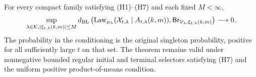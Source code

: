 \begin{theorem}
\label{thm:v36-microscopic-path-bridge}
For every compact family satisfying \textup{(H1)--(H7)} and each fixed
$M<\infty$,
\begin{align}
 \sup_{\substack{\lambda\in\mathcal K,
                     |\xi_{t,\lambda}(k,m)|\le M}}
 d_{\rm BL}\left(
  \operatorname{Law}_{\mu_\lambda}(\mathcal X_{t,\lambda}
                              \mid A_{t,\lambda}(k,m)),
  \mathsf{Br}_{\mathcal V_\lambda,\xi_{t,\lambda}(k,m)}\right)
                          \longrightarrow0.
 \label{eq:v36-exact-physical-bridge}
\end{align}
The probability in the conditioning is the original singleton
probability, positive for all sufficiently large $t$ on that set.
The theorem remains valid under nonnegative bounded regular initial
and terminal selectors satisfying \textup{(H7)} and the uniform
positive product-of-means condition.
\end{theorem}

